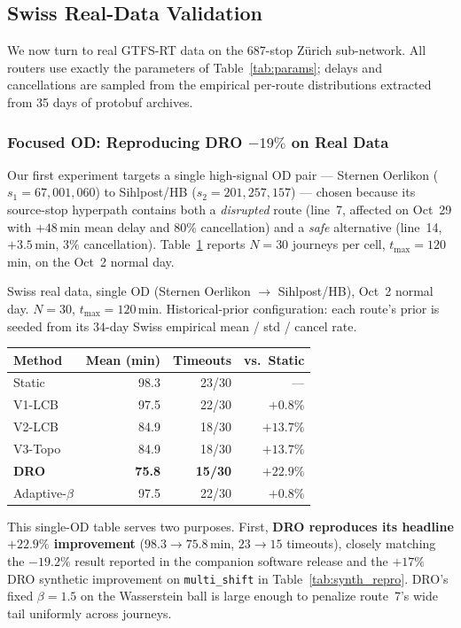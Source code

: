 \documentclass[opre,dblanonrev]{informs4}
\begin{document}
\subsection{Swiss Real-Data Validation}
\label{sec:swiss-results}

We now turn to real GTFS-RT data on the 687-stop Zürich sub-network.
All routers use exactly the parameters of Table~\ref{tab:params};
delays and cancellations are sampled from the empirical per-route
distributions extracted from 35 days of protobuf archives.

\subsubsection{Focused OD: Reproducing DRO $-19\%$ on Real Data}

Our first experiment targets a single high-signal OD pair --- Sternen
Oerlikon ($s_1{=}67{,}001{,}060$) to Sihlpost/HB ($s_2{=}201{,}257{,}157$)
--- chosen because its source-stop hyperpath contains both a \emph{disrupted}
route (line~7, affected on Oct~29 with $+48$\,min mean delay and 80\%
cancellation) and a \emph{safe} alternative (line~14, $+3.5$\,min, $3\%$
cancellation). Table~\ref{tab:swiss_focused} reports $N{=}30$ journeys
per cell, $t_{\max}{=}120$\,min, on the Oct~2 normal day.

\begin{table}
\TABLE
{Swiss real data, single OD (Sternen Oerlikon $\to$ Sihlpost/HB),
Oct~2 normal day. $N{=}30$, $t_{\max}{=}120$\,min. Historical-prior
configuration: each route's prior is seeded from its $34$-day Swiss
empirical mean / std / cancel rate.\label{tab:swiss_focused}}
{\begin{tabular}{l rrr}
\toprule
Method        & Mean (min) & Timeouts & vs.\ Static \\
\midrule
Static        & 98.3 & 23/30 & --- \\
V1-LCB        & 97.5 & 22/30 & $+0.8\%$ \\
V2-LCB        & 84.9 & 18/30 & $+13.7\%$ \\
V3-Topo       & 84.9 & 18/30 & $+13.7\%$ \\
\textbf{DRO}  & \textbf{75.8} & \textbf{15/30} & $\bm{+22.9\%}$ \\
Adaptive-$\beta$ & 97.5 & 22/30 & $+0.8\%$ \\
\bottomrule
\end{tabular}}
{}
\end{table}

This single-OD table serves two purposes. First, \textbf{DRO reproduces
its headline $\bm{+22.9\%}$ improvement} ($98.3\!\to\!75.8$\,min,
$23\!\to\!15$ timeouts), closely matching the $-19.2\%$ result reported
in the companion software release and the $+17\%$ DRO synthetic
improvement on \texttt{multi\_shift} in Table~\ref{tab:synth_repro}.
DRO's fixed $\beta=1.5$ on the Wasserstein ball is large enough to
penalize route~7's wide tail uniformly across journeys.
\end{document}
